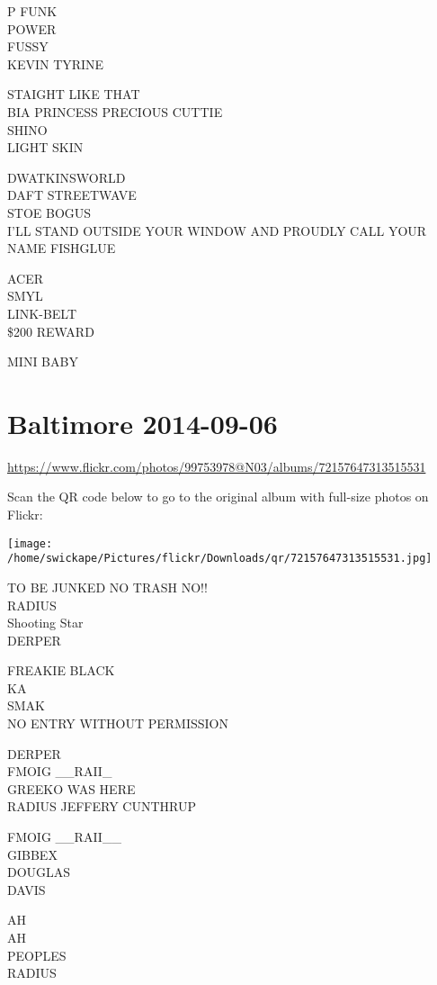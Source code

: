 \documentclass[10pt,letterpaper]{article}
\begin{document}
P FUNK\\
POWER\\
FUSSY\\
KEVIN TYRINE

STAIGHT LIKE THAT\\
BIA PRINCESS PRECIOUS CUTTIE\\
SHINO\\
LIGHT SKIN

DWATKINSWORLD\\
DAFT STREETWAVE\\
STOE BOGUS\\
I'LL STAND OUTSIDE YOUR WINDOW AND PROUDLY CALL YOUR NAME FISHGLUE

ACER\\
SMYL\\
LINK{-}BELT\\
\$200 REWARD

MINI BABY


\section*{Baltimore 2014-09-06}

\url{https://www.flickr.com/photos/99753978@N03/albums/72157647313515531}

Scan the QR code below to go to the original album with full-size photos on Flickr:

\texttt{[image: /home/swickape/Pictures/flickr/Downloads/qr/72157647313515531.jpg]}


TO BE JUNKED NO TRASH NO!!\\
RADIUS\\
Shooting Star\\
DERPER

FREAKIE BLACK\\
KA\\
SMAK\\
NO ENTRY WITHOUT PERMISSION

DERPER\\
FMOIG \_\_RAII\_\\
GREEKO WAS HERE\\
RADIUS JEFFERY CUNTHRUP

FMOIG \_\_RAII\_\_\\
GIBBEX\\
DOUGLAS\\
DAVIS

AH\\
AH\\
PEOPLES\\
RADIUS
\end{document}
